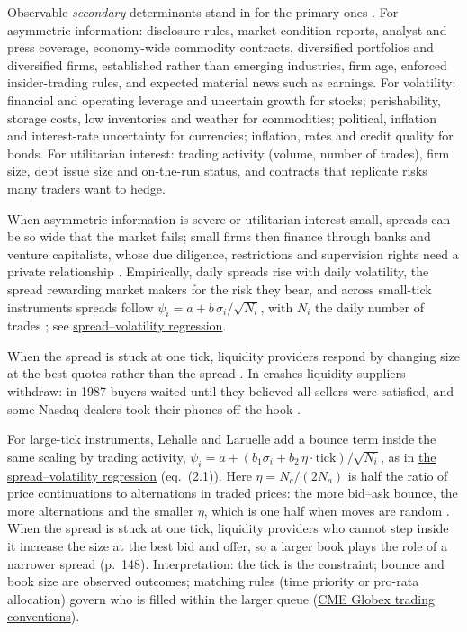 \begin{qfresult}
 Observable \emph{secondary} determinants stand in for the primary ones \citep[same chap., sec.~14.6.2, pp.~314--317]{alpha-harris}. For asymmetric information: disclosure rules, market-condition reports, analyst and press coverage, economy-wide commodity contracts, diversified portfolios and diversified firms, established rather than emerging industries, firm age, enforced insider-trading rules, and expected material news such as earnings. For volatility: financial and operating leverage and uncertain growth for stocks; perishability, storage costs, low inventories and weather for commodities; political, inflation and interest-rate uncertainty for currencies; inflation, rates and credit quality for bonds. For utilitarian interest: trading activity (volume, number of trades), firm size, debt issue size and on-the-run status, and contracts that replicate risks many traders want to hedge.

When asymmetric information is severe or utilitarian interest small, spreads can be so wide that the market fails; small firms then finance through banks and venture capitalists, whose due diligence, restrictions and supervision rights need a private relationship \citep[same chap., sec.~14.6.3, p.~317]{alpha-harris}. Empirically, daily spreads rise with daily volatility, the spread rewarding market makers for the risk they bear, and across small-tick instruments spreads follow $\psi_i=a+b\,\sigma_i/\sqrt{N_i}$, with $N_i$ the daily number of trades \citep[chap.~2, secs.~2.2 and~2.3.1, pp.~144--145 and~150--151]{alpha-laruelle}; see \hyperref[meth:spread-volatility-regression]{spread--volatility regression}.

When the spread is stuck at one tick, liquidity providers respond by changing size at the best quotes rather than the spread \citep[same chap., sec.~2.2, p.~148]{alpha-laruelle}. In crashes liquidity suppliers withdraw: in 1987 buyers waited until they believed all sellers were satisfied, and some Nasdaq dealers took their phones off the hook \citep[chap.~``Bubbles, Crashes, and Circuit Breakers'', pp.~561 and~563]{alpha-harris}.

For large-tick instruments, Lehalle and Laruelle add a bounce term inside the same scaling by trading activity, $\psi_i=a+(b_1\sigma_i+b_2\,\eta\cdot\mathrm{tick})/\sqrt{N_i}$, as in \hyperref[meth:spread-volatility-regression]{the spread--volatility regression} (eq.~(2.1)). Here $\eta=N_c/(2N_a)$ is half the ratio of price continuations to alternations in traded prices: the more bid--ask bounce, the more alternations and the smaller $\eta$, which is one half when moves are random \citep[chap.~2, sec.~2.2, eq.~(2.1), pp.~144--145]{alpha-laruelle}. When the spread is stuck at one tick, liquidity providers who cannot step inside it increase the size at the best bid and offer, so a larger book plays the role of a narrower spread (p.~148). Interpretation: the tick is the constraint; bounce and book size are observed outcomes; matching rules (time priority or pro-rata allocation) govern who is filled within the larger queue (\hyperref[conv:cme-globex-trading]{CME Globex trading conventions}).


\end{qfresult}
